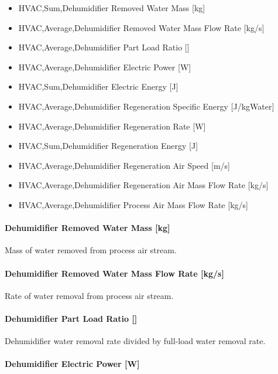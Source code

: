 \begin{itemize}
\item
  HVAC,Sum,Dehumidifier Removed Water Mass {[}kg{]}
\item
  HVAC,Average,Dehumidifier Removed Water Mass Flow Rate {[}kg/s{]}
\item
  HVAC,Average,Dehumidifier Part Load Ratio {[]}
\item
  HVAC,Average,Dehumidifier Electric Power {[}W{]}
\item
  HVAC,Sum,Dehumidifier Electric Energy {[}J{]}
\item
  HVAC,Average,Dehumidifier Regeneration Specific Energy {[}J/kgWater{]}
\item
  HVAC,Average,Dehumidifier Regeneration Rate {[}W{]}
\item
  HVAC,Sum,Dehumidifier Regeneration Energy {[}J{]}
\item
  HVAC,Average,Dehumidifier Regeneration Air Speed {[}m/s{]}
\item
  HVAC,Average,Dehumidifier Regeneration Air Mass Flow Rate {[}kg/s{]}
\item
  HVAC,Average,Dehumidifier Process Air Mass Flow Rate {[}kg/s{]}
\end{itemize}

\paragraph{Dehumidifier Removed Water Mass {[}kg{]}}\label{dehumidifier-removed-water-mass-kg}

Mass of water removed from process air stream.

\paragraph{Dehumidifier Removed Water Mass Flow Rate {[}kg/s{]}}\label{dehumidifier-removed-water-mass-flow-rate-kgs}

Rate of water removal from process air stream.

\paragraph{\texorpdfstring{Dehumidifier Part Load Ratio {[]}}{Dehumidifier Part Load Ratio }}\label{dehumidifier-part-load-ratio}

Dehumidifier water removal rate divided by full-load water removal rate.

\paragraph{Dehumidifier Electric Power {[}W{]}}\label{dehumidifier-electric-power-w}

